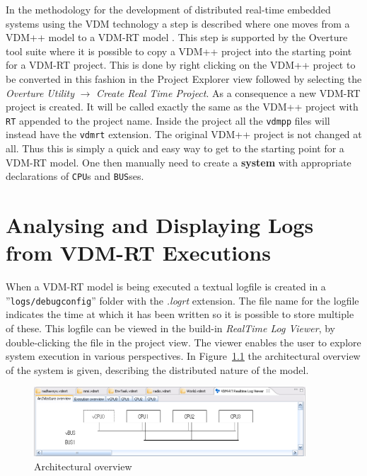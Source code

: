 \documentclass{overturerepchap}
\begin{document}
In the methodology for the development of distributed real-time
embedded systems using the VDM technology a step is described where one
moves from a VDM++ model to a VDM-RT model \cite{Larsen&09b}. This
step is supported by the Overture tool suite where it is possible to
copy a VDM++ project into the starting point for a VDM-RT
project. This is done by right clicking on the VDM++ project to be
converted in this fashion in the Project Explorer view followed by 
selecting the \emph{Overture Utility}
$\rightarrow$ \emph{Create Real Time Project}. As a consequence a new VDM-RT project is
created. It will be called exactly the
same as the VDM++ project with \texttt{RT} appended to the project
name. Inside the project all the \texttt{vdmpp} files will instead
have the \texttt{vdmrt} extension. The original VDM++ project is not
changed at all. Thus this is simply a quick and easy way to get to the
starting point for a VDM-RT model. One then manually need to
create a {\ttfamily\bf system} with appropriate declarations of
\texttt{CPU}s and \texttt{BUS}ses.
 
\chapter{Analysing and Displaying Logs from VDM-RT Executions}\label{sec:showlog}

When a VDM-RT model is being executed a textual logfile is created in
a ''\texttt{logs/debugconfig}'' folder with the \emph{.logrt} extension. The
file name for the logfile indicates the time at which it has been
written so it is possible to store multiple of these. This logfile can be
viewed in the build-in \emph{RealTime Log Viewer},
by double-clicking the file in the project view. The viewer enables
the user to explore system execution in various perspectives. In
Figure~\ref{fig:userguide:ArchitecturalOverview} the architectural
overview of the system is given, describing the distributed nature of
the model.

\begin{figure}[htp]
\begin{center}
  \includegraphics[width=4in]{figures/ArchitectureOverview}
  \caption{Architectural overview}
  \label{fig:userguide:ArchitecturalOverview}
\end{center}
\end{figure}
\end{document}
